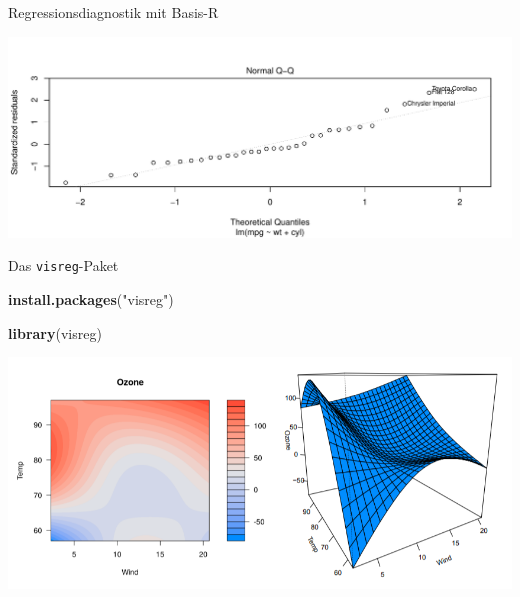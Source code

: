 \documentclass[
  ignorenonframetext,
]{beamer}
\newenvironment{Shaded}{\begin{snugshade}}{\end{snugshade}}
\newcommand{\DataTypeTok}[1]{\textcolor[rgb]{0.74,0.68,0.62}{\underline{#1}}}
\newcommand{\KeywordTok}[1]{\textcolor[rgb]{0.26,0.66,0.93}{\textbf{#1}}}
\newcommand{\NormalTok}[1]{\textcolor[rgb]{0.74,0.68,0.62}{#1}}
\newcommand{\OperatorTok}[1]{\textcolor[rgb]{0.74,0.68,0.62}{#1}}
\newcommand{\StringTok}[1]{\textcolor[rgb]{0.02,0.61,0.04}{#1}}
\begin{document}
\begin{frame}[fragile]{Regressionsdiagnostik mit Basis-R}
\protect\hypertarget{regressionsdiagnostik-mit-basis-r}{}

\begin{Shaded}
\end{Shaded}

\includegraphics{LineareRegression_files/figure-beamer/unnamed-chunk-30-1.pdf}

\end{frame}

\begin{frame}[fragile]{Das \texttt{visreg}-Paket}
\protect\hypertarget{das-visreg-paket}{}

\begin{Shaded}
\begin{Highlighting}[]
\KeywordTok{install.packages}\NormalTok{(}\StringTok{"visreg"}\NormalTok{)}
\end{Highlighting}
\end{Shaded}

\begin{Shaded}
\begin{Highlighting}[]
\KeywordTok{library}\NormalTok{(visreg)}
\end{Highlighting}
\end{Shaded}

\includegraphics{figure/visreg.PNG}

\end{frame}
\end{document}
